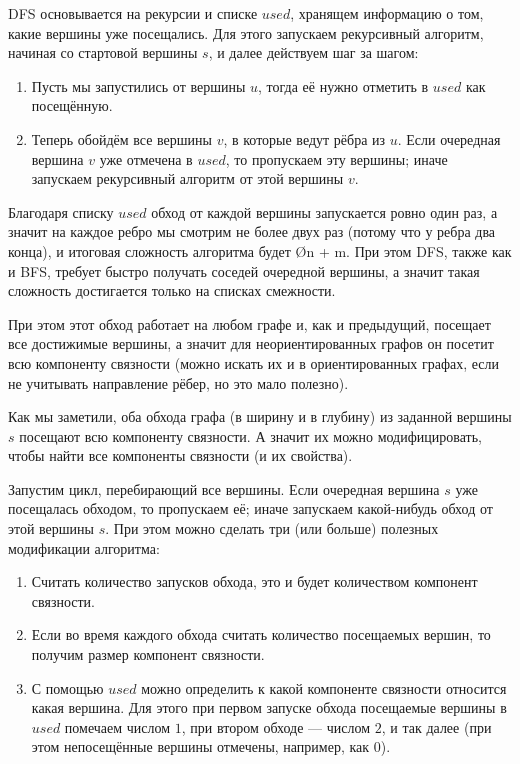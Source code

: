 DFS основывается на рекурсии и списке $used$, хранящем информацию о том, какие вершины уже посещались. Для этого запускаем рекурсивный алгоритм, начиная со стартовой вершины $s$, и далее действуем шаг за шагом:

\begin{enumerate}
    \item Пусть мы запустились от вершины $u$, тогда её нужно отметить в $used$ как посещённую.
    \item Теперь обойдём все вершины $v$, в которые ведут рёбра из $u$. Если очередная вершина $v$ уже отмечена в $used$, то пропускаем эту вершины; иначе запускаем рекурсивный алгоритм от этой вершины $v$.
\end{enumerate}

Благодаря списку $used$ обход от каждой вершины запускается ровно один раз, а значит на каждое ребро мы смотрим не более двух раз (потому что у ребра два конца), и итоговая сложность алгоритма будет \O{n + m}. При этом DFS, также как и BFS, требует быстро получать соседей очередной вершины, а значит такая сложность достигается только на списках смежности.

При этом этот обход работает на любом графе и, как и предыдущий, посещает все достижимые вершины, а значит для неориентированных графов он посетит всю компоненту связности (можно искать их и в ориентированных графах, если не учитывать направление рёбер, но это мало полезно).


Как мы заметили, оба обхода графа (в ширину и в глубину) из заданной вершины $s$ посещают всю компоненту связности. А значит их можно модифицировать, чтобы найти все компоненты связности (и их свойства).

Запустим цикл, перебирающий все вершины. Если очередная вершина $s$ уже посещалась обходом, то пропускаем её; иначе запускаем какой-нибудь обход от этой вершины $s$. При этом можно сделать три (или больше) полезных модификации алгоритма:

\begin{enumerate}
    \item Считать количество запусков обхода, это и будет количеством компонент связности.
    \item Если во время каждого обхода считать количество посещаемых вершин, то получим размер компонент связности.
    \item С помощью $used$ можно определить к какой компоненте связности относится какая вершина. Для этого при первом запуске обхода посещаемые вершины в $used$ помечаем числом $1$, при втором обходе — числом $2$, и так далее (при этом непосещённые вершины отмечены, например, как $0$).
\end{enumerate}


